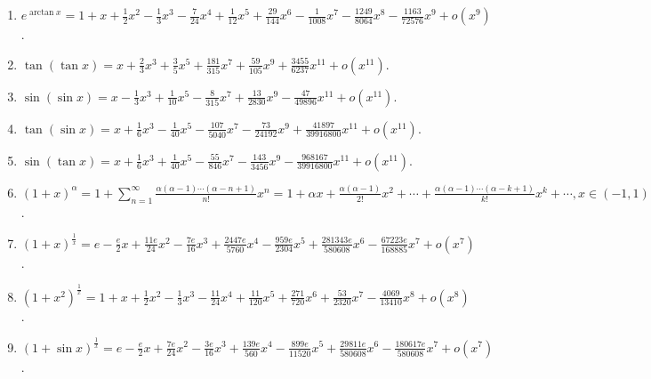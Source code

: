 \documentclass[../../main.tex]{subfiles}
\begin{document}
\begin{enumerate}
\item $e^{\arctan x}=1+x+\frac{1}{2}x^2-\frac{1}{3}x^3-\frac{7}{24}x^4+\frac{1}{12}x^5+\frac{29}{144}x^6-\frac{1}{1008}x^7-\frac{1249}{8064}x^8-\frac{1163}{72576}x^9+o(x^9)$.
\\
\item $\tan(\tan x)=x+\frac{2}{3}x^3+\frac{3}{5}x^5+\frac{181}{315}x^7+\frac{59}{105}x^9+\frac{3455}{6237}x^{11}+o(x^{11})$.
\\
\item $\sin(\sin x)=x-\frac{1}{3}x^3+\frac{1}{10}x^5-\frac{8}{315}x^7+\frac{13}{2830}x^9-\frac{47}{49896}x^{11}+o(x^{11})$.
\\
\item $\tan(\sin x)=x+\frac{1}{6}x^3-\frac{1}{40}x^5-\frac{107}{5040}x^7-\frac{73}{24192}x^9+\frac{41897}{39916800}x^{11}+o(x^{11})$.
\\
\item $\sin(\tan x)=x+\frac{1}{6}x^3+\frac{1}{40}x^5-\frac{55}{846}x^7-\frac{143}{3456}x^9-\frac{968167}{39916800}x^{11}+o(x^{11})$.
\\
\item $(1+x)^\alpha=1+\sum_{n=1}^{\infty}\frac{\alpha(\alpha-1)\cdots(\alpha-n+1)}{n!}x^n=1+\alpha x+\frac{\alpha(\alpha-1)}{2!}x^2+\cdots+\frac{\alpha(\alpha-1)\cdots(\alpha-k+1)}{k!}x^k+\cdots,x\in(-1,1)$.
\\
\item $(1+x)^{\frac{1}{x}}=e-\frac{e}{2}x+\frac{11e}{24}x^2-\frac{7e}{16}x^3+\frac{2447e}{5760}x^4-\frac{959e}{2304}x^5+\frac{281343e}{580608}x^6-\frac{67223e}{168885}x^7+o(x^7)$.
\\
\item $(1+x^2)^{\frac{1}{x}}=1+x+\frac{1}{2}x^2-\frac{1}{3}x^3-\frac{11}{24}x^4+\frac{11}{120}x^5+\frac{271}{720}x^6+\frac{53}{2320}x^7-\frac{4069}{13410}x^8+o(x^8)$.
\\
\item $(1+\sin x)^{\frac{1}{x}}=e-\frac{e}{2}x+\frac{7e}{24}x^2-\frac{3e}{16}x^3+\frac{139e}{560}x^4-\frac{899e}{11520}x^5+\frac{29811e}{580608}x^6-\frac{180617e}{580608}x^7+o(x^7)$.
\end{enumerate}
\end{document}
